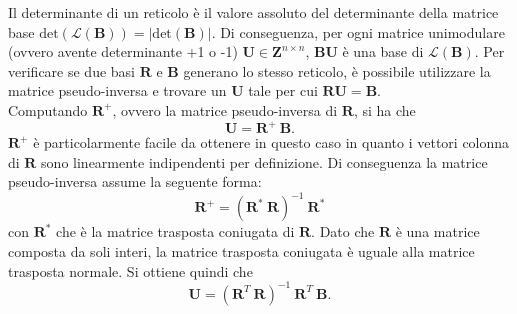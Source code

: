 Il determinante di un reticolo è il valore assoluto del 
determinante della matrice base 
$\text{det}(\mathcal{L}(\mathbf{B})) = |\text{det}(\mathbf{B})|$. 
Di conseguenza, per ogni matrice unimodulare (ovvero avente determinante +1 o -1) 
$\mathbf{U} \in \mathbf{Z}^{n \times n}$, $\mathbf{B}\mathbf{U}$ è una base di 
$\mathcal{L}(\mathbf{B})$. Per verificare se due basi $\mathbf{R}$ e $\mathbf{B}$ generano
lo stesso reticolo, è possibile utilizzare la matrice pseudo-inversa e trovare un $\mathbf{U}$
tale per cui $\mathbf{R}\mathbf{U} = \mathbf{B}$.
\\
Computando $\mathbf{R}^+$, ovvero la matrice pseudo-inversa di $\mathbf{R}$, si ha che
\[
    \mathbf{U} = \mathbf{R}^+ \ \mathbf{B}.
\]
$\mathbf{R}^+$ è particolarmente facile da ottenere in questo caso in quanto i vettori
colonna di $\mathbf{R}$ sono linearmente indipendenti per definizione. Di conseguenza la
matrice pseudo-inversa assume la seguente forma:
\[
    \mathbf{R}^+ = (\mathbf{R}^* \ \mathbf{R})^{-1} \ \mathbf{R}^*
\]
con $\mathbf{R}^*$ che è la matrice trasposta coniugata di $\mathbf{R}$. Dato che $\mathbf{R}$
è una matrice composta da soli interi, la matrice trasposta coniugata è uguale alla matrice
trasposta normale. Si ottiene quindi che
\[
    \mathbf{U} = (\mathbf{R}^T \ \mathbf{R})^{-1} \ \mathbf{R}^T \ \mathbf{B}.
\]
